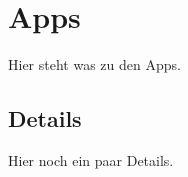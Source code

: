 \section{Apps}
\begin{frame}
Hier steht was zu den Apps.
\end{frame}

\subsection{Details}
\begin{frame}
Hier noch ein paar Details.
\end{frame}